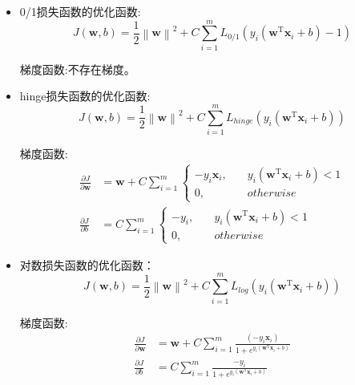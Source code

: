 \documentclass[withoutpreface,bwprint]{NoteBook}
\begin{document}
\begin{itemize}
    
    \item 0/1损失函数的优化函数:
    \begin{equation}
        \label{eq:0/1损失函数的优化函数}
        J \left ( \mathbf{w},b \right ) = \frac{1}{2} \left\| \mathbf{w} \right\|^2 + C \sum_{i=1}^{m} L_{0/1}(y_i (\mathbf{w}^\mathrm{T} \mathbf{x}_i + b)-1)
    \end{equation}

    梯度函数:不存在梯度。

    \item hinge损失函数的优化函数:
    \begin{equation}
        \label{eq:hinge损失函数的优化函数}
        J(\mathbf{w},b) = \frac{1}{2}\left\| \mathbf{w} \right\|^2 + C \sum_{i=1}^{m} L_{hinge}(y_i(\mathbf{w}^\mathrm{T} \mathbf{x}_i + b))
    \end{equation}

    梯度函数:
    \begin{align}
        \label{eq:hinge损失函数的优化函数的梯度函数}
        \frac{\partial J}{\partial \mathbf{w}} &= 
        \mathbf{w} + C \sum_{i=1}^{m}
        \begin{cases}
            -y_i \mathbf{x}_i, & \quad y_i(\mathbf{w}^\mathrm{T} \mathbf{x}_i + b) < 1 \\
            0, & \quad otherwise
        \end{cases} \\
        \frac{\partial J}{\partial b} &= 
        C \sum_{i=1}^{m}
        \begin{cases}
            -y_i, & \quad y_i(\mathbf{w}^\mathrm{T} \mathbf{x}_i + b) < 1 \\
            0, & \quad otherwise
        \end{cases}
    \end{align}

    \item 对数损失函数的优化函数：
    \begin{equation}
        \label{eq:对数损失函数的优化函数}
        J(\mathbf{w},b) = \frac{1}{2}\left\| \mathbf{w} \right\|^2 + C \sum_{i=1}^{m} L_{log}(y_i(\mathbf{w}^\mathrm{T} \mathbf{x}_i + b))
    \end{equation}

    梯度函数:
    \begin{align}
        \label{eq:对数损失函数的优化函数的梯度函数}
        \frac{\partial J}{\partial \mathbf{w}} &= 
        \mathbf{w} + C \sum_{i=1}^{m} \frac{(-y_i \mathbf{x}_i)}{1+e^{y_i(\mathbf{w}^\mathrm{T} \mathbf{x}_i + b)}} \\
        \frac{\partial J}{\partial b} &= 
        C \sum_{i=1}^{m} \frac{-y_i}{1+e^{y_i(\mathbf{w}^\mathrm{T} \mathbf{x}_i + b)}}
    \end{align}


\end{itemize}
\end{document}
